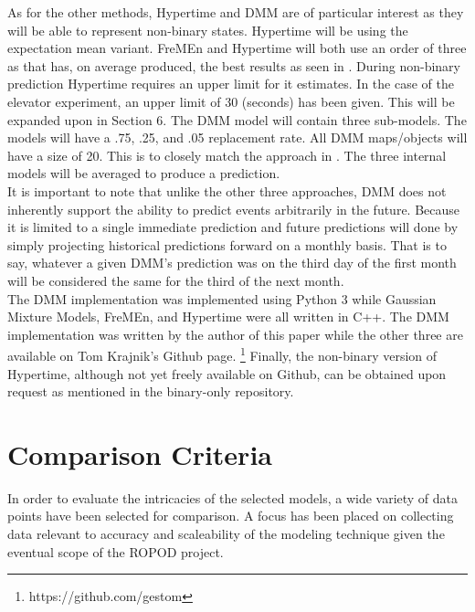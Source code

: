   As for the other methods, Hypertime and DMM are of particular interest as they will
  be able to represent non-binary states. Hypertime will be using the
  expectation mean variant.  FreMEn and
  Hypertime will both use an order of three as that has, on average produced,
  the best results as seen in \cite{Krajnik2015}. During
  non-binary prediction Hypertime requires an upper limit for it estimates. In
  the case of the elevator experiment, an upper limit of 30 (seconds) has been
  given. This will be expanded upon in Section 6. The DMM model will
  contain three sub-models. The models will have a .75, .25, and
  .05 replacement rate. All DMM maps/objects will have a size of 20. This is to closely match
  the approach in \cite{Biber2005}. The three internal models will be averaged
  to produce a prediction.\\

  It is important to note that unlike the other three approaches, DMM does
  not inherently support the ability to predict events arbitrarily in the future.
  Because it is limited to a single immediate prediction and future predictions
  will done by simply projecting historical predictions forward on a monthly basis.
  That is to say, whatever a given DMM's prediction was on the third day of the first month
  will be considered the same for the third of the next month. \\

  The DMM implementation was implemented using Python 3 while Gaussian Mixture
  Models, FreMEn, and Hypertime were all written in C++. The DMM implementation
  was written by the author of this paper while the other three
  are available on Tom Krajnik's Github page. \footnote[1]{https://github.com/gestom}
  Finally, the non-binary
  version of Hypertime, although not yet freely available on Github, can
  be obtained upon request as mentioned in the binary-only repository. \\




  \section{ Comparison Criteria }
  In order to evaluate the intricacies of the selected models, a wide variety
  of data points have been selected for comparison. A focus has been placed on
  collecting data relevant to accuracy and scaleability of the modeling
  technique given the eventual scope of the ROPOD project. \\

